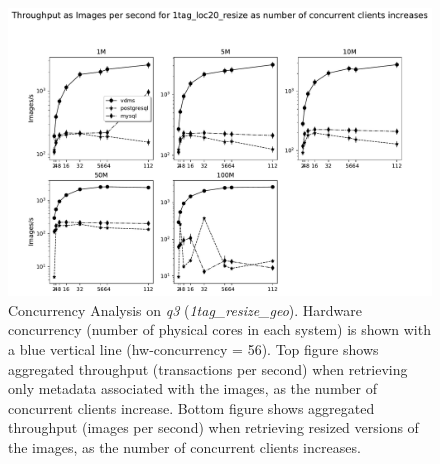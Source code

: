 \begin{figure}[ht]
\includegraphics[width=\textwidth]{figures/plot_conc_q_1tag_loc20_resize_mosaic_results_throughput_db_size}
\caption{Concurrency Analysis on \textit{q3} (\textit{1tag\_resize\_geo}).
Hardware concurrency (number of physical cores in each system)
is shown with a blue vertical line (hw-concurrency = 56).
Top figure shows aggregated throughput (transactions per second)
when retrieving only metadata associated with the images, as the number of
concurrent clients increase.
Bottom figure shows aggregated throughput (images per second) when retrieving
resized versions of the images, as the number of concurrent clients increases.}
\label{fig:concurrency_comparison}
\end{figure}

